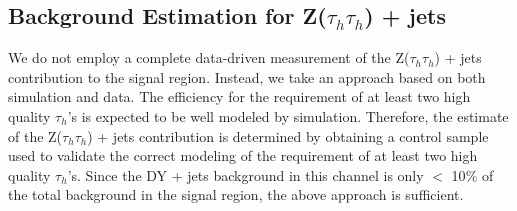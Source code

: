 \begin{table}[ht]
  \caption{QCD yields in regions $A$ (signal region), $B$, $C$, and $D$.}
  \label{tab:QCDBGEstimationTable}
\end{table}







\subsection{Background Estimation for Z($\tau_h\tau_h$) + jets}

We do not employ a complete data-driven measurement of the Z($\tau_h \tau_h$) + jets contribution to the signal region. Instead, we take an approach based on both simulation and data. The efficiency for the requirement of at least two high quality $\tau_h$'s is expected to be well modeled by simulation. Therefore, the estimate of the Z($\tau_h \tau_h$) + jets contribution is determined by obtaining a control sample used to validate the correct modeling of the requirement of at least two high quality $\tau_h$'s. Since the DY + jets background in this channel is only $<$ 10$\%$ of the total background in the signal region, the above approach is sufficient.\\


